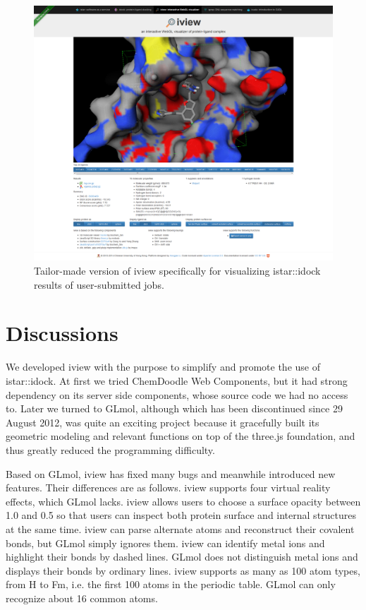 \begin{figure}
\begin{center}
\includegraphics[width=\linewidth]{../iview/idock.png}
\end{center}
\caption{Tailor-made version of iview specifically for visualizing istar::idock results of user-submitted jobs.}
\label{fig:idock}
\end{figure}

\section{Discussions}

We developed iview with the purpose to simplify and promote the use of istar::idock. At first we tried ChemDoodle Web Components, but it had strong dependency on its server side components, whose source code we had no access to. Later we turned to GLmol, although which has been discontinued since 29 August 2012, was quite an exciting project because it gracefully built its geometric modeling and relevant functions on top of the three.js foundation, and thus greatly reduced the programming difficulty.

Based on GLmol, iview has fixed many bugs and meanwhile introduced new features. Their differences are as follows. iview supports four virtual reality effects, which GLmol lacks. iview allows users to choose a surface opacity between 1.0 and 0.5 so that users can inspect both protein surface and internal structures at the same time. iview can parse alternate atoms and reconstruct their covalent bonds, but GLmol simply ignores them. iview can identify metal ions and highlight their bonds by dashed lines. GLmol does not distinguish metal ions and displays their bonds by ordinary lines. iview supports as many as 100 atom types, from H to Fm, i.e. the first 100 atoms in the periodic table. GLmol can only recognize about 16 common atoms.


